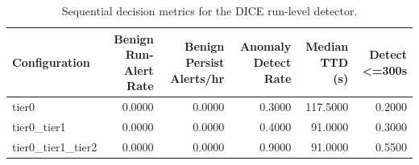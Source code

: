 \begin{table}[t]
\centering
\caption{Sequential decision metrics for the DICE run-level detector.}
\label{tab:dice_sequential_metrics}
\footnotesize
\begin{tabular}{lrrrrr}
\toprule
Configuration & Benign Run-Alert Rate & Benign Persist Alerts/hr & Anomaly Detect Rate & Median TTD (s) & Detect <=300s \\
\midrule
tier0 & 0.0000 & 0.0000 & 0.3000 & 117.5000 & 0.2000 \\
tier0_tier1 & 0.0000 & 0.0000 & 0.4000 & 91.0000 & 0.3000 \\
tier0_tier1_tier2 & 0.0000 & 0.0000 & 0.9000 & 91.0000 & 0.5500 \\
\bottomrule
\end{tabular}

\end{table}
